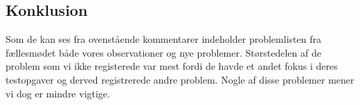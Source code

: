 \documentclass[12pt]{article}
\begin{document}
\subsection*{Konklusion}
Som de kan ses fra ovenstående kommentarer indeholder problemlisten fra fællesmødet både vores observationer og nye problemer. Størstedelen af de problem som vi ikke registerede var mest fordi de havde et andet fokus i deres testopgaver og derved registrerede andre problem. Nogle af disse problemer mener vi dog er mindre vigtige.
\end{document}
